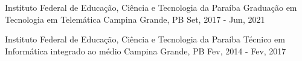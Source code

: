 
\begin{cventries}
  \cventry
    {Instituto Federal de Educação, Ciência e Tecnologia da Paraíba} %
    {Graduação em Tecnologia em Telemática} %
    {Campina Grande, PB} %
    {Set, 2017 - Jun, 2021} %
    {}

  \cventry
    {Instituto Federal de Educação, Ciência e Tecnologia da Paraíba}
    {Técnico em Informática integrado ao médio}
    {Campina Grande, PB}
    {Fev, 2014 - Fev, 2017}
    {}
\end{cventries}

